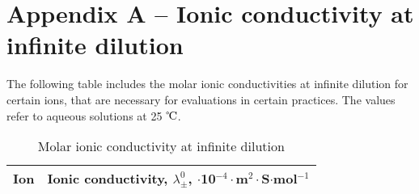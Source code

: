 \fancyhead[LO,RE]{\thesection}
\fancyfoot[LE,RO]{\thepage}

\section*{Appendix A -- Ionic conductivity at infinite dilution}
The following table includes the molar ionic conductivities at infinite dilution for certain ions, that are necessary for evaluations in certain practices. The values refer to aqueous solutions at 25 $\celsius$.

\begin{table}[h!]
\centering
\caption{Molar ionic conductivity at infinite dilution}
\label{table:conductivities}
\begin{tabular}{r|l}
                        Ion & Ionic conductivity, $\lambda^0_\pm$, $\cdot$10$^{-4}\cdot$m$^2 \cdot$S$\cdot$mol$^{-1}$\\
                        \hline



\end{tabular}
\end{table}
